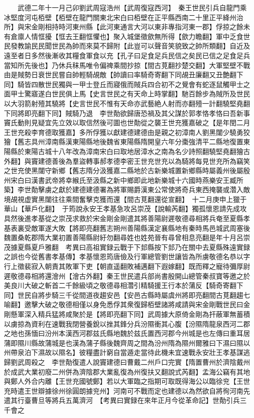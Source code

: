 　　武德二年十一月己卯劉武周寇浩州【武周復寇西河】　秦王世民引兵自龍門乘冰堅度河屯栢壁【栢壁在龍門關東北宋白曰栢壁在正平縣西南二十里正平絳州治所】與宋金剛相持時河東州縣【此河東通言大河以東非專指河東一郡】俘掠之餘未有倉廪人情恇擾【恇去王翻恇懼也】聚入城堡徵歛無所得【歛力瞻翻】軍中乏食世民發教諭民民聞世民為帥而來莫不歸附【此豈可以聲音笑貌致之帥所類翻】自近及遠至者日多然後漸收其糧食軍食以充【孔子曰足食足兵民信之矣民已信之足食足兵當知所先後也】乃休兵秣馬唯令偏禆乘間抄掠【間古莧翻抄楚交翻】大軍堅壁不戰由是賊勢日衰世民嘗自帥輕騎覘敵【帥讀曰率騎奇寄翻下同覘丑廉翻又丑艶翻下同】騎皆四散世民獨與一甲士登丘而寢俄而賊兵四合初不之覺會有蛇逐鼠觸甲士之面甲士驚寤遂白世民俱上馬【史言世民之有天命上時掌翻】馳百餘步為賊所及世民以大羽箭射殪其驍將【史言世民不惟有天命亦武藝絶人射而亦翻殪一計翻驍堅堯翻下同將即亮翻下同】賊騎乃退　李世勣欲歸唐恐禍及其父謀於郭孝恪孝恪曰吾新事竇氏動則見疑宜先立效以取信然後可圖也世勣從之襲王世充獲嘉破之【是年閏二月王世充殺李育德取獲嘉】多所俘獲以獻建德建德由是親之初漳南人劉黑闥少驍勇狡獪【舊志具州漳南縣漢東陽縣地後魏省東陽縣隋開皇六年分棗強清平二縣地復置東陽縣於東陽古城十八年改為漳南宋白曰取地居漳水之南為名少詩照翻驍堅堯翻獪古外翻】與竇建德善後為羣盜轉事郝孝德李密王世充世充以為騎將每見世充所為竊笑之世充使黑闥守新鄉【舊志隋分汲獲嘉二縣地於古新樂城置新鄉縣時屬義州後屬殷州宋白曰漢書武帝將幸緱氏至汲縣之新中鄉即此地新樂城十六國時燕樂安王臧所築】李世勣擊虜之獻於建德建德署為將軍賜爵漢東公常使將奇兵東西掩襲或濳入敵境覘視虚實黑闥往往乘間奮擊克獲而還【間古莧翻還從宣翻】　十二月庚申上獵于華山【華戶化翻】　于筠說永安王孝基急攻呂崇茂【說輸芮翻】獨孤懷恩請先成攻具然後進孝基從之崇茂求救於宋金剛金剛遣其將善陽尉遲敬德尋相將兵奄至夏縣孝基表裏受敵軍遂大敗【將即亮翻舊志朔州善陽縣漢定襄縣地有秦時馬邑城武周塞後魏置桑乾郡隋大業初置善陽縣尉紆勿翻尋姓也姓苑晉有尋曾相息亮翻是年十月呂崇茂據夏縣夏戶雅翻　考異曰高祖實録云戰于下邽縣按下邽乃在關中去夏縣殊遠實録之誤也今從舊書孝基傳】孝基懷恩筠唐儉及行軍總管劉世讓皆為所虜敬德名恭以字行上徵裴寂入朝責其敗軍下吏【朝直遥翻敗補邁翻下遐嫁翻】既而釋之寵待彌厚尉遲敬德尋相將還澮州【澮古外翻】秦王世民遣兵部尚書殷開山總管秦叔寶等邀之於美良川大破之斬首二千餘級頃之敬德尋相濳引精騎援王行本於蒲反【騎奇寄翻下同】世民自將步騎三千從間道夜趨安邑【安邑古縣時屬虞州將即亮翻間古莧翻趨七喻翻】邀擊大破之敬德相僅以身免悉俘其衆復歸栢壁諸將咸請與宋金剛戰世民曰金剛懸軍深入精兵猛將咸聚於是【將即亮翻下同】武周據大原倚金剛為扞蔽軍無蓄積以虜掠為資利在速戰我閉營養銳以挫其鋒分兵汾隰衝其心腹【汾隰隋龍泉西河二郡之地也孫愐曰汾州本漢西河郡兹氏縣地魏於兹氏置西河郡今州城是也左傳曰重耳居蒲即隰川縣故蒲城是也漢為蒲子縣後魏齊周之間為汾州隋為隰州爾雅曰下濕曰隰以州帶泉泊下濕故以隰名】彼糧盡計窮自當遁走當待此機未宜速戰永安壯王孝基謀逃歸劉武周殺之　李世勣復遣人說竇建德曰曹戴二州戶口完實【隋置曹州於濟陰戴州於成武大業初廢二州併為濟陰郡大業亂復為州復扶又翻說式芮翻】孟海公竊有其地與鄭人外合内離【王世充國號鄭】若以大軍臨之指期可取既得海公以臨徐兖【王世充時遣王世辯據徐州徐圓朗據兖州】河南可不戰而定也建德以為然欲自將徇河南先遣其行臺曹旦等將兵五萬濟河　【考異曰實録在來年正月今從革命記】世勣引兵三千會之

